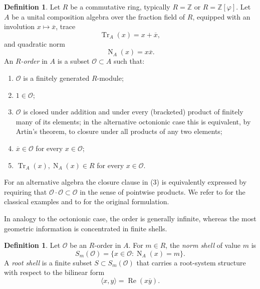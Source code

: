 \documentclass[12pt,oneside,english]{amsart}
\numberwithin{equation}{section}
\numberwithin{figure}{section}
\numberwithin{table}{section}
\theoremstyle{plain}
\theoremstyle{definition}
\newtheorem{definition}[theorem]{Definition}
\theoremstyle{remark}
\newcommand{\ZZ}{\mathbb Z}
\newcommand{\Zphi}{\mathbb Z[\varphi]}
\newcommand{\Tr}{\operatorname{Tr}}
\newcommand{\Norm}{\operatorname{N}}
\newcommand{\Rea}{\operatorname{Re}}
\begin{document}
\begin{definition}
\label{def:order}
Let \(R\) be a commutative ring, typically \(R=\ZZ\) or \(R=\Zphi\). Let \(A\) be a unital composition algebra over the fraction field of \(R\), equipped with an involution \(x\mapsto \overline{x}\), trace
\begin{equation}
\Tr_A(x)=x+\overline{x},
\label{eq:composition-trace}
\end{equation}
and quadratic norm
\begin{equation}
\Norm_A(x)=x\overline{x}.
\label{eq:composition-norm}
\end{equation}
An \emph{\(R\)-order} in \(A\) is a subset \(\mathcal O\subset A\) such that:
\begin{enumerate}
\item \(\mathcal O\) is a finitely generated \(R\)-module;
\item \(1\in\mathcal O\);
\item \(\mathcal O\) is closed under addition and under every (bracketed) product of finitely many of its elements; in the alternative octonionic case this is equivalent, by Artin's theorem, to closure under all products of any two elements;
\item \(\overline{x}\in\mathcal O\) for every \(x\in\mathcal O\);
\item \(\Tr_A(x),\Norm_A(x)\in R\) for every \(x\in\mathcal O\).
\end{enumerate}
For an alternative algebra the closure clause in (3) is equivalently expressed by requiring that \(\mathcal O\cdot\mathcal O\subset\mathcal O\) in the sense of pointwise products. We refer to \cite{Co46,CoSm,Conway} for the classical examples and to \cite{Di23} for the original formulation.
\end{definition}

In analogy to the octonionic case, the order is generally infinite, whereas the most geometric information is concentrated in finite shells.

\begin{definition}
Let \(\mathcal O\) be an \(R\)-order in \(A\). For \(m\in R\), the \emph{norm shell} of value \(m\) is
\begin{equation}
S_m(\mathcal O)=\{x\in\mathcal O:\Norm_A(x)=m\}.
\label{eq:norm-shell}
\end{equation}
A \emph{root shell} is a finite subset \(S\subset S_m(\mathcal O)\) that carries a root-system structure with respect to the bilinear form
\begin{equation}
\langle x,y\rangle=\Rea(x\overline{y}).
\label{eq:inner-product-algebra}
\end{equation}
\end{definition}
\end{document}
